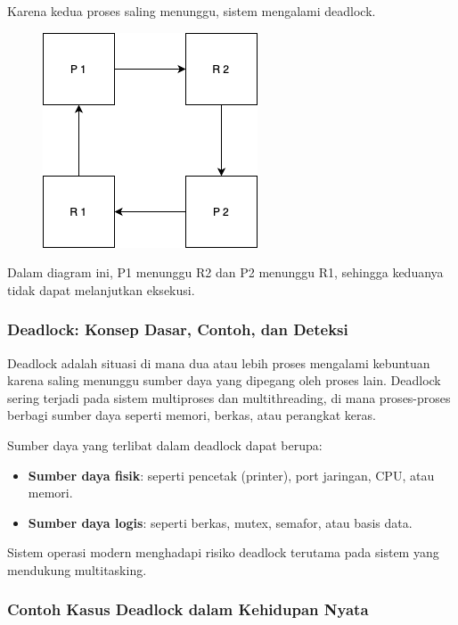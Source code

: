 \documentclass[12pt]{article}
\begin{document}
Karena kedua proses saling menunggu, sistem mengalami deadlock.

\begin{figure}[htbp]
    \centering
    \includegraphics[width=0.5\linewidth]
    {asset/deadlockRAG.drawio.png}
    \label{fig:deadlock-RAG}
\end{figure}

Dalam diagram ini, P1 menunggu R2 dan P2 menunggu R1, sehingga keduanya tidak dapat melanjutkan eksekusi.

\subsubsection{Deadlock: Konsep Dasar, Contoh, dan Deteksi}

Deadlock adalah situasi di mana dua atau lebih proses mengalami kebuntuan karena saling menunggu sumber daya yang dipegang oleh proses lain. Deadlock sering terjadi pada sistem multiproses dan multithreading, di mana proses-proses berbagi sumber daya seperti memori, berkas, atau perangkat keras.

Sumber daya yang terlibat dalam deadlock dapat berupa:

\begin{itemize}
    \item \textbf{Sumber daya fisik}: seperti pencetak (printer), port jaringan, CPU, atau memori.
    \item \textbf{Sumber daya logis}: seperti berkas, mutex, semafor, atau basis data.
\end{itemize}

Sistem operasi modern menghadapi risiko deadlock terutama pada sistem yang mendukung multitasking.

\subsubsection{Contoh Kasus Deadlock dalam Kehidupan Nyata}
\end{document}
